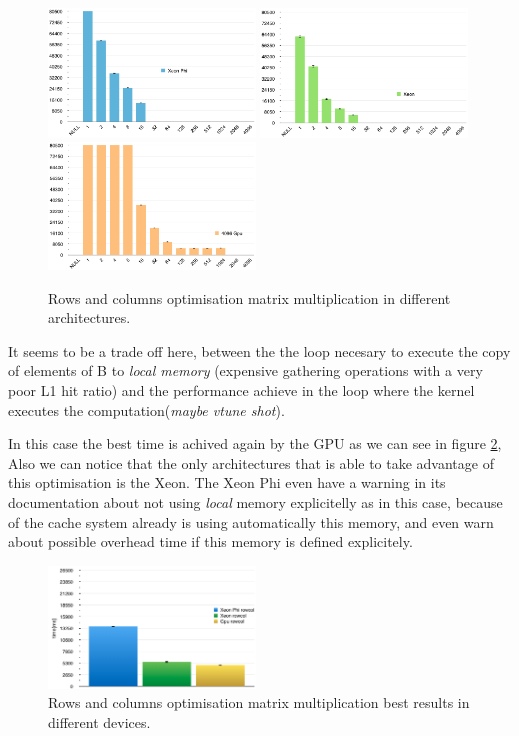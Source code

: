 \begin{figure}[!h]
    \centering
    \includegraphics[width=0.49\textwidth]{figures/opt3_phi.png}
    \includegraphics[width=0.49\textwidth]{figures/opt3_cpu.png}
    \includegraphics[width=0.49\textwidth]{figures/opt3_gpu.png}
    \caption{Rows and columns optimisation matrix multiplication in different architectures.}
    \label{RowsCols}
\end{figure}

\par{It seems to be a trade off here, between the the loop necesary to execute 
    the copy of elements of B to \emph{local memory}
    (expensive gathering operations with a very poor L1 hit ratio) and the 
    performance achieve in the loop where the kernel executes
    the computation(\emph{maybe vtune shot}).}

\par{In this case the best time is achived again by the GPU as we can see in 
    figure \ref{RowsColRes}, Also we can notice that the only 
    architectures that is able to take advantage of this optimisation is the 
    Xeon. The Xeon Phi even have a warning in its 
    documentation about not using \emph{local} memory explicitelly as in this 
    case, because of the cache system already is using 
    automatically this memory, and even warn about possible overhead time if 
    this memory is defined explicitely\cite{opencl_phi}.}

\begin{figure}[!h]
    \centering
    \includegraphics[width=0.49\textwidth]{figures/rowColRes.png}
    \caption{Rows and columns optimisation matrix multiplication best results in different devices.}
    \label{RowsColRes}
\end{figure}

